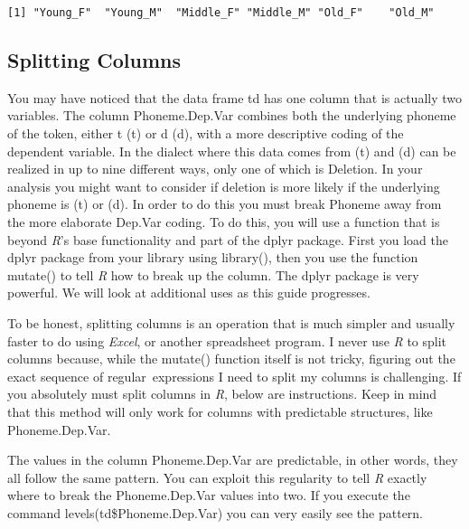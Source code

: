 \documentclass[
  12pt,
  letterpaper]{article}
\newenvironment{Shaded}{\begin{snugshade}}{\end{snugshade}}
\newcommand{\FunctionTok}[1]{\textcolor[rgb]{0.28,0.35,0.67}{#1}}
\newcommand{\NormalTok}[1]{\textcolor[rgb]{0.00,0.23,0.31}{#1}}
\newcommand{\SpecialCharTok}[1]{\textcolor[rgb]{0.37,0.37,0.37}{#1}}
\renewcommand\texttt[1]{{\ttfamily\color{BrickRed}#1}}
\begin{document}
\begin{verbatim}
[1] "Young_F"  "Young_M"  "Middle_F" "Middle_M" "Old_F"    "Old_M"   
\end{verbatim}

\hypertarget{splitting-columns}{%
\subsection{Splitting Columns}\label{splitting-columns}}

You may have noticed that the data frame \texttt{td} has one column that
is actually two variables. The column \texttt{Phoneme.Dep.Var} combines
both the underlying phoneme of the token, either \texttt{t} (t) or
\texttt{d} (d), with a more descriptive coding of the dependent
variable. In the dialect where this data comes from (t) and (d) can be
realized in up to nine different ways, only one of which is
\texttt{Deletion}. In your analysis you might want to consider if
deletion is more likely if the underlying phoneme is (t) or (d). In
order to do this you must break \texttt{Phoneme} away from the more
elaborate \texttt{Dep.Var} coding. To do this, you will use a function
that is beyond \emph{R}'s base functionality and part of the
\texttt{dplyr} package. First you load the \texttt{dplyr} package from
your library using \texttt{library()}, then you use the function
\texttt{mutate()} to tell \emph{R} how to break up the column. The
\texttt{dplyr} package is very powerful. We will look at additional uses
as this guide progresses.

To be honest, splitting columns is an operation that is much simpler and
usually faster to do using \emph{Excel}, or another spreadsheet program.
I never use \emph{R} to split columns because, while the
\texttt{mutate()} function itself is not tricky, figuring out the exact
sequence of \texttt{regular\ expressions} I need to split my columns is
challenging. If you absolutely must split columns in \emph{R}, below are
instructions. Keep in mind that this method will only work for columns
with predictable structures, like \texttt{Phoneme.Dep.Var}.

The values in the column \texttt{Phoneme.Dep.Var} are predictable, in
other words, they all follow the same pattern. You can exploit this
regularity to tell \emph{R} exactly where to break the
\texttt{Phoneme.Dep.Var} values into two. If you execute the command
\texttt{levels(td\$Phoneme.Dep.Var)} you can very easily see the
pattern.

\begin{Shaded}
\end{Shaded}
\end{document}
